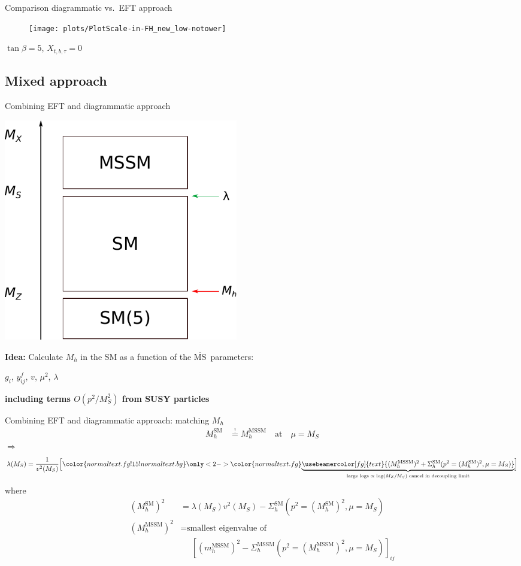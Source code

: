 \documentclass[hyperref={pdfpagelabels=false},ngerman]{beamer}
\renewcommand{\emph}{\textbf}
\newcommand{\MSbar}{\ensuremath{\overline{\text{MS}}}}
\newcommand{\SM}{\ensuremath{\text{SM}}}
\begin{document}
\begin{frame}{Comparison diagrammatic vs.\ EFT approach}
  \begin{figure}
    \centering
    \texttt{[image: plots/PlotScale-in-FH\_new\_low-notower]}
  \end{figure}
  $\tan\beta = 5$, $X_{t,b,\tau} = 0$
\end{frame}


\subsection{Mixed approach}

\begin{frame}{Combining EFT and diagrammatic approach}
  \begin{center}
    \includegraphics[width=0.45\textwidth]{images/mssm-sm-tower-eft}\\[1em]
  \end{center}
  \emph{Idea:} Calculate $M_h$ in the SM as a function of the \MSbar\ parameters:\\[1em]
  \begin{center}
    $g_i$, $y^f_{ij}$, $v$, $\mu^2$, $\lambda$
  \end{center}
  \emph{including terms $O(p^2/M_S^2)$ from SUSY particles}
\end{frame}

\begin{frame}{Combining EFT and diagrammatic approach: matching $M_h$}
  \begin{align*}
    M_h^{\SM} &\overset{!}{=} M_h^\text{MSSM} \quad \text{at} \quad \mu = M_S
  \end{align*}
  $\Rightarrow$
  \begin{align*}
    \lambda(M_S) = \frac{1}{v^2(M_S)} \Big[
    {\color{normal text.fg!15!normal text.bg}
    \only<2->{\color{normal text.fg}}{%
    \underbrace{\usebeamercolor[fg]{text}{(M_h^\text{MSSM})^2 + \Sigma^\SM_h(p^2 = (M_h^\SM)^2,\mu = M_S)}}_{\text{large logs $\propto\log(M_Z/M_S)$ cancel in decoupling limit}}}}
    \Big]
  \end{align*}
  where
  \begin{align*}
    (M_h^{\SM})^2 &= \lambda(M_S) v^2(M_S) - \Sigma^{\SM}_h(p^2 = (M_h^{\SM})^2,\mu = M_S) \\
    (M_h^\text{MSSM})^2 &= \text{smallest eigenvalue of} \\
    &\phantom{={}} \left[(m_h^\text{MSSM})^2 - \Sigma^\text{MSSM}_h(p^2 = (M_h^\text{MSSM})^2,\mu = M_S)\right]_{ij}
  \end{align*}
\end{frame}
\end{document}
